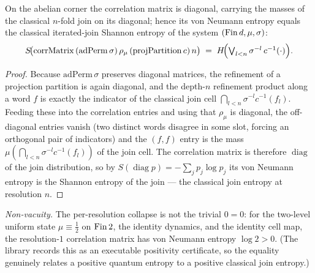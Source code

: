 \begin{theorem}\label{vonNeumannEntropy_corrMatrix_eq_ksEntropySeq}
  \leanok
  On the abelian corner the correlation matrix is diagonal, carrying the masses of the classical
  \(n\)-fold join on its diagonal; hence its von Neumann entropy equals the classical iterated-join
  Shannon entropy of the system \((\operatorname{Fin} d,\mu,\sigma)\):
  \[
    S\!\bigl(\mathrm{corrMatrix}\,(\mathrm{adPerm}\,\sigma)\,\rho_\mu\,(\mathrm{projPartition}\,c)\,n\bigr)
      \;=\; H\!\Bigl(\textstyle\bigvee_{l<n}\sigma^{-l}\,c^{-1}(\cdot)\Bigr).
  \]
\end{theorem}
\begin{proof}\leanok
  Because \(\mathrm{adPerm}\,\sigma\) preserves diagonal matrices, the refinement of a projection
  partition is again diagonal, and the depth-\(n\) refinement product along a word \(f\) is exactly
  the indicator of the classical join cell \(\bigcap_{l<n}\sigma^{-l}c^{-1}(f_l)\). Feeding these into
  the correlation entries and using that \(\rho_\mu\) is diagonal, the off-diagonal entries vanish
  (two distinct words disagree in some slot, forcing an orthogonal pair of indicators) and the
  \((f,f)\) entry is the mass \(\mu(\bigcap_{l<n}\sigma^{-l}c^{-1}(f_l))\) of the join cell. The
  correlation matrix is therefore \(\operatorname{diag}\) of the join distribution, so by
  \(S(\operatorname{diag}p)=-\sum_j p_j\log p_j\) its von Neumann entropy is the Shannon entropy of the
  join --- the classical join entropy at resolution \(n\).
\end{proof}

\emph{Non-vacuity.} The per-resolution collapse is not the trivial \(0=0\): for the two-level uniform
state \(\mu\equiv\tfrac12\) on \(\operatorname{Fin} 2\), the identity dynamics, and the identity cell map, the
resolution-\(1\) correlation matrix has von Neumann entropy \(\log 2>0\). (The library records this as
an executable positivity certificate, so the equality genuinely relates a positive quantum entropy to a
positive classical join entropy.)

